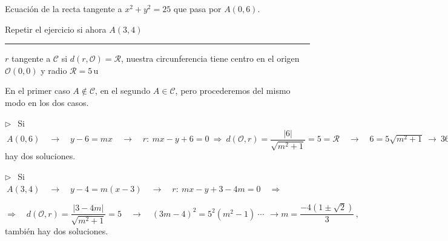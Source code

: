 \begin{miejercicio}

Ecuación de la recta tangente a $x^2+y^2=25$ que pasa por $A(0,6)$.

\vspace{2mm} Repetir el ejercicio si ahora $A(3,4)$

\rule{250pt}{0.1pt}


\vspace{2mm} $r$ tangente a $\mathcal C$ si $d(r,\mathcal O)=\mathcal R$, nuestra circunferencia tiene centro en el origen $\mathcal O(0,0)$ y radio $\mathcal R=5\, \mathrm{u}$

\vspace{2mm} En el primer caso $A\notin \mathcal C$, en el segundo $A\in \mathcal C$, pero procederemos del mismo modo en los dos casos.	

\vspace{4mm} $\triangleright \ \ $ Si $\ A(0,6) \quad \to \quad y-6=mx \quad \to \quad r:\ mx-y+6=0 \ \Rightarrow \ d(\mathcal O,r)=\dfrac{|6|}{\sqrt{m^2+1}}=5=\mathcal R \quad \to \quad 6=5\sqrt{m^2+1} \ \to \ 36=25(m^2+1) \ \to m^2=11/25 \ \to \ m=\pm \dfrac{\sqrt{11}}{5}\, , \ $ hay dos soluciones.

\vspace{4mm} $\triangleright \ \ $ Si $\ A(3,4) \quad \to \quad y-4=m(x-3) \quad \to \quad r:\ mx-y+3-4m=0 \quad \Rightarrow \quad $

$\Rightarrow \quad  d(\mathcal O,r)=\dfrac{|3-4m|}{\sqrt{m^2+1}}=5 \quad \to \quad (3m-4)^2=5^2(m^2-1) \ \cdots \ \ \to m=\dfrac{-4(1\pm \sqrt{2})}{3}\, , \ $ también hay dos soluciones.

\end{miejercicio}

